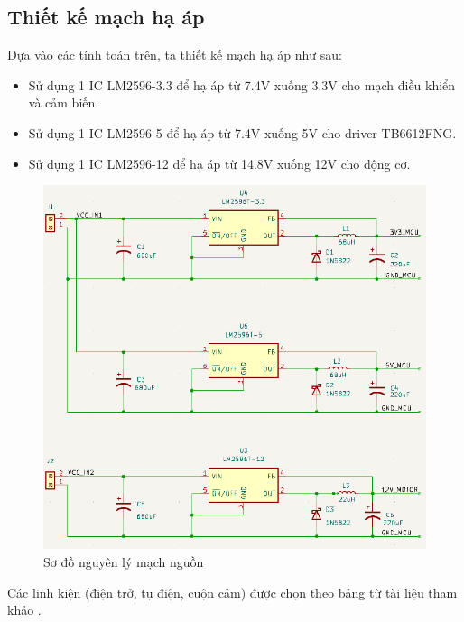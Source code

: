             \subsection{Thiết kế mạch hạ áp}
                \hspace*{0.6cm}Dựa vào các tính toán trên, ta thiết kế mạch hạ áp như sau:
                \begin{itemize}
                    \item Sử dụng 1 IC LM2596-3.3 để hạ áp từ 7.4V xuống 3.3V cho mạch điều khiển và cảm biến.
                    \item Sử dụng 1 IC LM2596-5 để hạ áp từ 7.4V xuống 5V cho driver TB6612FNG.
                    \item Sử dụng 1 IC LM2596-12 để hạ áp từ 14.8V xuống 12V cho động cơ.
                \end{itemize}
                \begin{figure}[H]
                    \centering
                    \includegraphics[width=1\textwidth]{pictures/chapter4/c4_p13_PowerSchematic.png}
                    \caption{Sơ đồ nguyên lý mạch nguồn}
                    \label{fig:4-9}
                \end{figure}
                \hspace*{0.6cm}Các linh kiện (điện trở, tụ điện, cuộn cảm) được chọn theo bảng từ tài liệu tham khảo \cite{lm2596}.
